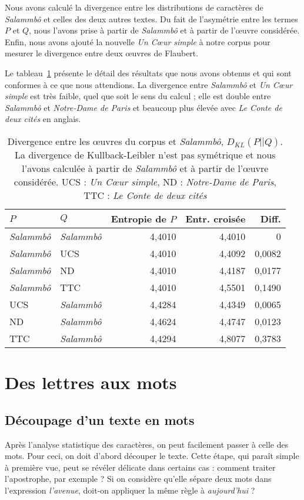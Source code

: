 \documentclass[]{article}
\begin{document}
Nous avons calculé la divergence entre les distributions de caractères de \textit{Salammbô} et celles des deux autres textes. Du fait de l'asymétrie entre les termes $P$ et $Q$, nous l'avons prise à partir de \textit{Salammbô} et à partir de l'œuvre considérée. Enfin, nous avons ajouté la nouvelle \textit{Un Cœur simple} à notre corpus pour mesurer le divergence entre deux œuvres de Flaubert.


Le tableau~\ref{entropie_x} présente le détail des  résultats que nous avons obtenus et qui sont conformes à ce que nous attendions. La divergence entre \textit{Salammbô} et \textit{Un Cœur simple} est très faible, quel que soit le sens du calcul ; elle est double entre \textit{Salammbô} et \textit{Notre-Dame de Paris} et beaucoup plus élevée avec \textit{Le Conte de deux cités} en anglais.

\begin{table}[htdp]
\caption{Divergence entre les œuvres du corpus et \textit{Salammbô}, $D_{KL}(P||Q)$. La divergence de Kullback-Leibler n'est pas symétrique et nous l'avons calculée à partir de \textit{Salammbô} et à partir de l'œuvre considérée. UCS : \textit{Un Cœur simple}, ND : \textit{Notre-Dame de Paris}, TTC : \textit{Le Conte de deux cités}}
\begin{center}\begin{tabular}{llrrr}
\hline
$P$&$Q$&Entropie de $P$&Entr. croisée&Diff.\\
\hline
\hline
\textit{Salammbô}&\textit{Salammbô}&4,4010& 4,4010&0\\
\hline
\textit{Salammbô}&UCS& 4,4010&4,4092&0,0082\\
\textit{Salammbô}&ND&4,4010&4,4187&0,0177\\
\textit{Salammbô}&TTC&4,4010&4,5501&0,1490\\
\hline
UCS&\textit{Salammbô}&4,4284&4,4349&0,0065\\
ND&\textit{Salammbô}&4,4624&4,4747&0,0123\\
TTC&\textit{Salammbô}&4,4294&4,8077&0,3783\\
\hline
\end{tabular} 
\end{center}
\label{entropie_x}
\end{table}


\section{Des lettres aux mots}
\subsection{Découpage d'un texte en mots}
Après l'analyse statistique des caractères, on peut facilement passer à celle des mots. Pour ceci, on doit d'abord découper le texte. Cette étape, qui paraît simple à première vue, peut se révéler délicate dans certains cas : comment traiter l'apostrophe, par exemple ? Si on considère qu'elle sépare deux mots dans l'expression \textit{l'avenue}, doit-on appliquer la même règle à \textit{aujourd'hui} ? 
\end{document}
